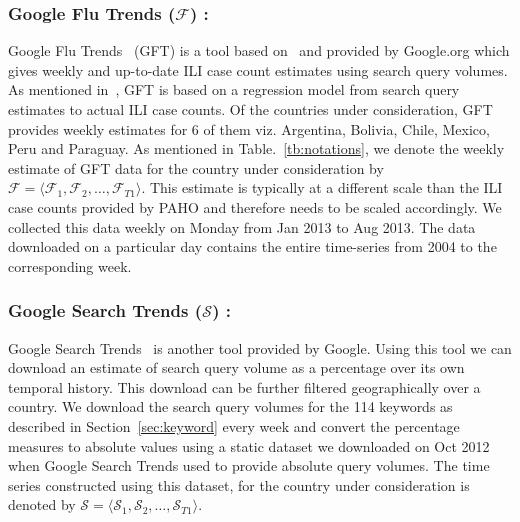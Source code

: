 \subsubsection{Google Flu Trends ($\mathcal{F}$) :}
Google Flu Trends~\cite{GFT:2013} (GFT) is a tool based
on~\cite{ginsberg2008detecting} and provided by Google.org which gives weekly
and up-to-date ILI case count estimates using search query volumes. As
mentioned in~\cite{ginsberg2008detecting}, GFT is based on a regression model
from search query estimates to actual ILI case counts.  Of the countries under
consideration, GFT provides weekly estimates for 6 of them viz.  Argentina,
Bolivia, Chile, Mexico, Peru and Paraguay. As mentioned in
Table.~\ref{tb:notations}, we denote the weekly estimate of GFT data for the
country under consideration by $\mathcal{F} = \langle \mathcal{F}_1,
\mathcal{F}_2, \dots, \mathcal{F}_{T1} \rangle$. This estimate is typically at
a different scale than the ILI case counts provided by PAHO and therefore needs
to be scaled accordingly.  We collected this data weekly on Monday from Jan
2013 to Aug 2013. The data downloaded on a particular day contains the entire
time-series from 2004 to the corresponding week.  
 

\subsubsection{Google Search Trends ($\mathcal{S}$) :} Google Search Trends~\cite{GST:2013} is
another tool provided by Google. Using this tool we can download an estimate of
search query volume as a percentage over its own temporal history. This
download can be further filtered geographically over a country.  We download
the search query volumes for the 114 keywords as described in
Section~\ref{sec:keyword} every week and convert the percentage measures to
absolute values using a static dataset we downloaded on Oct 2012 when Google
Search Trends used to provide absolute query volumes. The
time series constructed using this dataset, for the country under consideration
is denoted by
$\mathcal{S} = \langle \mathcal{S}_1, \mathcal{S}_2, \dots, \mathcal{S}_{T1} \rangle$.

